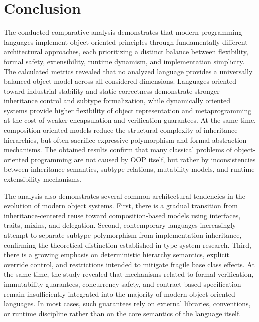 \chapter{Conclusion}
\label{chap:conclusion}

The conducted comparative analysis demonstrates that modern programming languages implement object-oriented principles through fundamentally different architectural approaches, each prioritizing a distinct balance between flexibility, formal safety, extensibility, runtime dynamism, and implementation simplicity. The calculated metrics revealed that no analyzed language provides a universally balanced object model across all considered dimensions. Languages oriented toward industrial stability and static correctness demonstrate stronger inheritance control and subtype formalization, while dynamically oriented systems provide higher flexibility of object representation and metaprogramming at the cost of weaker encapsulation and verification guarantees. At the same time, composition-oriented models reduce the structural complexity of inheritance hierarchies, but often sacrifice expressive polymorphism and formal abstraction mechanisms. The obtained results confirm that many classical problems of object-oriented programming are not caused by OOP itself, but rather by inconsistencies between inheritance semantics, subtype relations, mutability models, and runtime extensibility mechanisms.

The analysis also demonstrates several common architectural tendencies in the evolution of modern object systems. First, there is a gradual transition from inheritance-centered reuse toward composition-based models using interfaces, traits, mixins, and delegation. Second, contemporary languages increasingly attempt to separate subtype polymorphism from implementation inheritance, confirming the theoretical distinction established in type-system research. Third, there is a growing emphasis on deterministic hierarchy semantics, explicit override control, and restrictions intended to mitigate fragile base class effects. At the same time, the study revealed that mechanisms related to formal verification, immutability guarantees, concurrency safety, and contract-based specification remain insufficiently integrated into the majority of modern object-oriented languages. In most cases, such guarantees rely on external libraries, conventions, or runtime discipline rather than on the core semantics of the language itself.

